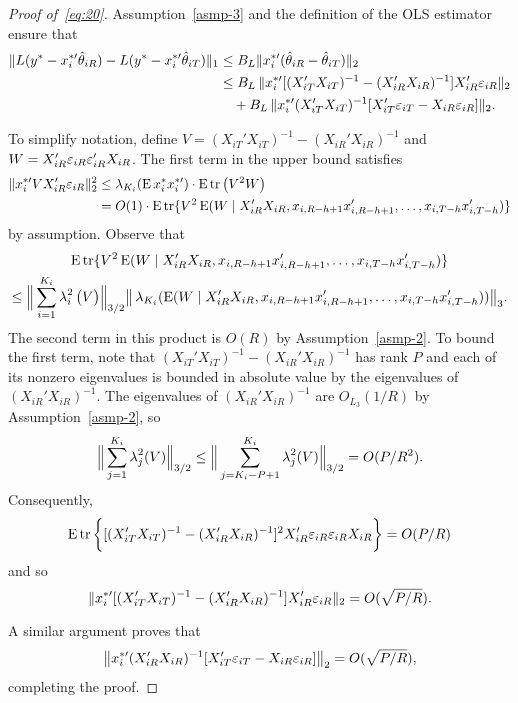 \documentclass[12pt]{article}
\begin{document}
\begin{proof}[Proof of~\eqref{eq:20}]
Assumption~\ref{asmp-3} and the definition of the OLS estimator
ensure that
\begin{align*}
  \|L(y^{*} -  x_i^{*\prime} \hat\theta_{iR}) - L(y^{*} - x_i^{*\prime} \hat\theta_{iT}) \|_1
  &\leq B_{L} \| x_i^{*\prime} (\hat\theta_{iR} - \hat\theta_{iT}) \|_2 \\
  &\leq B_{L} \, \| x_i^{*\prime} [(X_{iT}'X_{iT})^{-1} -
  (X_{iR}'X_{iR})^{-1}] X_{iR}' \mathbf{\varepsilon}_{iR} \|_2 \\
  &\quad+ B_L \, \| x_i^{*\prime}
  (X_{iT}'X_{iT})^{-1}[X_{iT}'\mathbf{\varepsilon}_{iT} - X_{iR}
  \mathbf{\varepsilon}_{iR} ] \|_2 .
\end{align*}

To simplify notation, define $V = (X_{iT}'X_{iT})^{-1} -
(X_{iR}'X_{iR})^{-1}$ and $W = X_{iR}'\mathbf{\varepsilon}_{iR} \mathbf{\varepsilon}_{iR}'X_{iR}$. The
first term in the upper bound satisfies
\begin{align*}
  \| x_i^{*\prime} V X_{iR}' \mathbf{\varepsilon}_{iR} \|_2^2
  &\leq \operatorname{\lambda}_{K_i}(\operatorname{E} x_i^* x_i^{*\prime}) \cdot \operatorname{E} \operatorname{tr}\big( V^2 W \big) \\
  &= O(1) \cdot \operatorname{E} \operatorname{tr}\{ V^2 \operatorname{E}(W \mid
  X_{iR}'X_{iR}, x_{i,R-h+1} x_{i,R-h+1}',\dots, x_{i,T-h} x_{i,T-h}')\}
\end{align*}
by assumption. Observe that
\begin{multline*}
  \operatorname{E} \operatorname{tr}\{ V^2 \operatorname{E}(W \mid X_{iR}'X_{iR}, x_{i,R-h+1} x_{i,R-h+1}',\dots, x_{i,T-h} x_{i,T-h}')\}
  \\ \leq
  \Big\rVert \sum_{i=1}^{K_i} \operatorname{\lambda}_i^2 \big(V\big) \Big\rVert_{3/2}
  \big\rVert \operatorname{\lambda}_{K_i}(\operatorname{E}(W \mid
  X_{iR}'X_{iR}, x_{i,R-h+1} x_{i,R-h+1}',\dots, x_{i,T-h} x_{i,T-h}')) \big\rVert_3.
\end{multline*}
The second term in this product is $O(R)$ by
Assumption~\ref{asmp-2}. To bound the first term, note that
$(X_{iT}'X_{iT})^{-1} - (X_{iR}'X_{iR})^{-1}$ has rank $P$ and
each of its nonzero eigenvalues is bounded in absolute value by the
eigenvalues of $(X_{iR}'X_{iR})^{-1}$. The eigenvalues of
$(X_{iR}'X_{iR})^{-1}$ are $O_{L_3}(1/R)$ by Assumption~\ref{asmp-2}, so
\begin{equation*}
  \Big\|\sum_{j=1}^{K_i}
  \operatorname{\lambda}_j^2(V)\Big\|_{3/2}
  \leq \Big\|\sum_{j=K_i - P+1}^{K_i} \operatorname{\lambda}_j^2(V) \Big\|_{3/2}
  = O(P/R^2).
\end{equation*}
Consequently,
\begin{equation*}
  \operatorname{E} \operatorname{tr}\bigg\{[(X_{iT}'X_{iT})^{-1} - (X_{iR}'X_{iR})^{-1}]^2
  X_{iR}'\mathbf{\varepsilon}_{iR} \mathbf{\varepsilon}_{iR}X_{iR} \bigg\} = O(P/R)
\end{equation*}
and so
\begin{equation*}
  \| x_i^{*\prime} [(X_{iT}'X_{iT})^{-1} -
  (X_{iR}'X_{iR})^{-1}] X_{iR}' \mathbf{\varepsilon}_{iR} \|_2 = O(\sqrt{P/R}).
\end{equation*}

A similar argument proves that
\begin{equation*}
  \big\| x_i^{*\prime} (X_{iR}'X_{iR})^{-1}
  [X_{iT}'\mathbf{\varepsilon}_{iT} - X_{iR} \mathbf{\varepsilon}_{iR} ] \big\|_2 =  O(\sqrt{P/R}),
\end{equation*}
completing the proof.
\end{proof}
\end{document}
